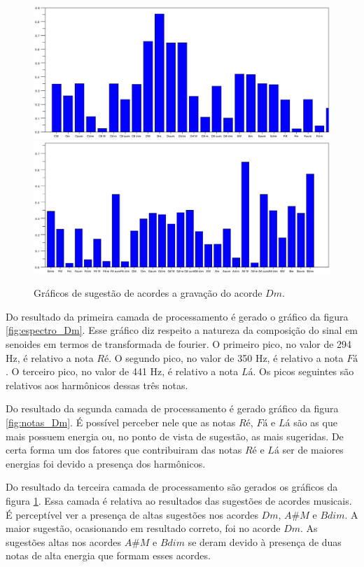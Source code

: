 \begin{figure}[h]
	\centering
		\includegraphics[keepaspectratio=true,scale=0.49]{figuras/Dm/acordes_1_Dm.eps}
		\includegraphics[keepaspectratio=true,scale=0.49]{figuras/Dm/acordes_2_Dm.eps}
	\caption{Gráficos de sugestão de acordes a gravação do acorde $Dm$.}
  \label{fig:acordes_Dm}
\end{figure}


Do resultado da primeira camada de processamento é gerado o gráfico da figura \ref{fig:espectro_Dm}. Esse gráfico diz respeito a natureza da composição do sinal em senoides em termos de transformada de fourier. O primeiro pico, no valor de 294 Hz, é relativo a nota $Ré$. O segundo pico, no valor de 350 Hz, é relativo a nota $Fá$. O terceiro pico, no valor de 441 Hz, é relativo a nota $Lá$. Os picos seguintes são relativos aos harmônicos dessas três notas.

Do resultado da segunda camada de processamento é gerado gráfico da figura \ref{fig:notas_Dm}. É possível perceber nele que as notas $Ré$, $Fá$ e $Lá$ são as que mais possuem energia ou, no ponto de vista de sugestão, as mais sugeridas. De certa forma um dos fatores que contribuiram das notas $Ré$ e $Lá$ ser de maiores energias foi devido a presença dos harmônicos.

Do resultado da terceira camada de processamento são gerados os gráficos da figura \ref{fig:acordes_Dm}. Essa camada é relativa ao resultados das sugestões de acordes musicais. É perceptível ver a presença de altas sugestões nos acordes $Dm$, $A\#M$ e $Bdim$. A maior sugestão, ocasionando em resultado correto, foi no acorde $Dm$. As sugestões altas nos acordes $A\#M$ e $Bdim$ se deram devido à presença de duas notas de alta energia que formam esses acordes.

